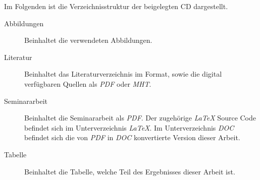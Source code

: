 \label{cha:Beigaben}

Im Folgenden ist die Verzeichnisstruktur der beigelegten CD dargestellt.
 
\begin{description}
	\item[Abbildungen]
		Beinhaltet die verwendeten Abbildungen.
	\item[Literatur]
		Beinhaltet das Literaturverzeichnis im \textit{\BibTeX{}} Format, sowie die digital verfügbaren Quellen als \textit{PDF} oder \textit{MHT}.
	\item[Seminararbeit]
		Beinhaltet die Seminararbeit als \textit{PDF}.
		Der zugehörige \emph{\LaTeX{}} Source Code befindet sich im Unterverzeichnis \textit{LaTeX}.
		Im Unterverzeichnis \textit{DOC} befindet sich die von \textit{PDF} in \textit{DOC} konvertierte Version dieser Arbeit.
	\item[Tabelle]
		Beinhaltet die Tabelle, welche Teil des Ergebnisses dieser Arbeit ist.
\end{description}